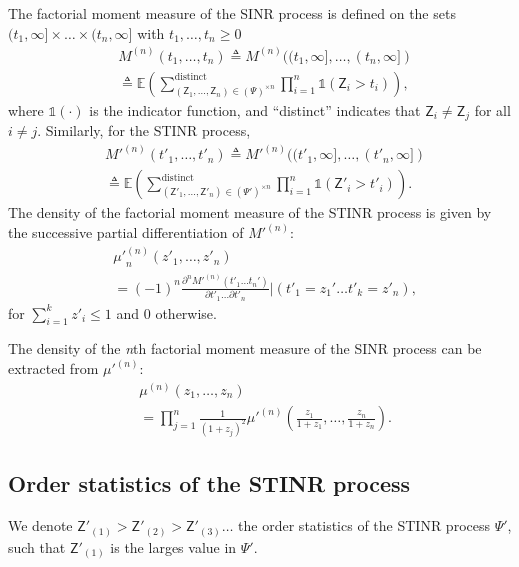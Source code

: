 \documentclass[lettersize,journal]{IEEEtran}
\begin{document}
The factorial moment measure of the SINR process is defined on the sets $(t_1,\infty] \times \dots \times (t_n, \infty]$ with $t_1,\dots,t_n\geq 0$
    \begin{align}
      &M^{(n)}(t_1,\dots,t_n) \triangleq M^{(n)}((t_1,\infty],\dots,(t_n,\infty]) \nonumber \\
          & \triangleq \mathbb{E} \left( \sum^{\text{distinct}}_{\left(\mathsf{Z}_1, \dots, \mathsf{Z}_n \right) \in (\Psi)^{\times n}} \prod_{i=1}^n \mathds{1}(\mathsf{Z}_i >t_i)\right),
    \end{align}
    where $\mathds{1}(\cdot)$ is the indicator function, and ``distinct'' indicates that $\mathsf{Z}_i \neq \mathsf{Z}_j $ for all $i \neq j $. Similarly, for the STINR process,
    \begin{align}
          &M'^{(n)}(t'_1,\dots,t'_n) \triangleq M'^{(n)}((t'_1,\infty],\dots,(t'_n,\infty]) \nonumber \\
              &\triangleq \mathbb{E} \left( \sum^{\text{distinct}}_{\left(\mathsf{Z}'_1, \dots, \mathsf{Z}'_n \right) \in (\Psi')^{\times n}} \prod_{i=1}^n \mathds{1}(\mathsf{Z}'_i >t'_i)\right).
    \end{align}
 The density of the factorial moment measure of the STINR process is given by the successive partial differentiation of $M'^{(n)}$:
    \begin{align}
      \label{eq:differatemomentmeasure}
     &{\mu'}_n^{(n)}(z'_1,\dots,z'_n) \nonumber \\&= (-1)^n \frac{\partial^n M'^{(n)}(t'_1\dots t_n') }{\partial t'_1 \dots \partial t'_n} |(t'_1=z_1'\dots t'_k=z'_n),
    \end{align}
    for $\sum_{i=1}^k z'_i\leq 1$ and $0$ otherwise. 

    The density of the \textit{n}th factorial moment measure of the SINR process can be extracted from $\mu'^{(n)}$:
    \begin{align}
      \label{eq:densitySINR}
      &\mu^{(n)}(z_1,\dots,z_n) \nonumber\\
      &= \prod_{j=1}^n\frac{1}{(1+z_j)^2}\mu'^{(n)}\left(\frac{z_1}{1+z_1},\dots,\frac{z_n}{1+z_n}\right).
    \end{align}

    
  
\subsection{Order statistics of the STINR process}
We denote $\mathsf{Z}'_{(1)}>\mathsf{Z}'_{(2)} >\mathsf{Z}'_{(3)} \dots$ the order statistics of the STINR process $\Psi'$, such that $\mathsf{Z}'_{(1)}$ is the larges value in $\Psi'$.
\end{document}
